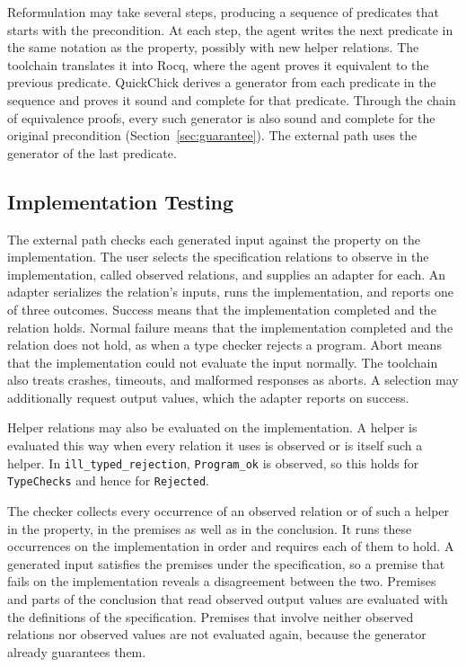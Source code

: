 Reformulation may take several steps, producing a sequence of predicates that
starts with the precondition.
At each step, the agent writes the next predicate in the same notation as the
property, possibly with new helper relations.
The toolchain translates it into Rocq, where the agent proves it equivalent to
the previous predicate.
QuickChick derives a generator from each predicate in the sequence and proves
it sound and complete for that predicate.
Through the chain of equivalence proofs, every such generator is also sound and
complete for the original precondition (Section~\ref{sec:guarantee}).
The external path uses the generator of the last predicate.

\subsection{Implementation Testing}
\label{sec:implementation-testing}

The external path checks each generated input against the property on the
implementation.
The user selects the specification relations to observe in the implementation,
called observed relations, and supplies an adapter for each.
An adapter serializes the relation's inputs, runs the implementation, and
reports one of three outcomes.
Success means that the implementation completed and the relation holds.
Normal failure means that the implementation completed and the relation does
not hold, as when a type checker rejects a program.
Abort means that the implementation could not evaluate the input normally.
The toolchain also treats crashes, timeouts, and malformed responses as aborts.
A selection may additionally request output values, which the adapter reports
on success.

Helper relations may also be evaluated on the implementation.
A helper is evaluated this way when every relation it uses is observed or is
itself such a helper.
In \texttt{ill\_typed\_rejection}, \texttt{Program\_ok} is observed, so this
holds for \texttt{TypeChecks} and hence for \texttt{Rejected}.

The checker collects every occurrence of an observed relation or of such a
helper in the property, in the premises as well as in the conclusion.
It runs these occurrences on the implementation in order and requires each of
them to hold.
A generated input satisfies the premises under the specification, so a premise
that fails on the implementation reveals a disagreement between the two.
Premises and parts of the conclusion that read observed output values are
evaluated with the definitions of the specification.
Premises that involve neither observed relations nor observed values are not
evaluated again, because the generator already guarantees them.

